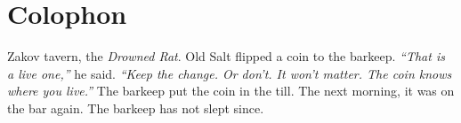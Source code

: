 \section*{Colophon}
Zakov tavern, the \textit{Drowned Rat}. Old Salt flipped a coin to the barkeep. \textit{``That is a live one,''} he said. \textit{``Keep the change. Or don't. It won't matter. The coin knows where you live.''} The barkeep put the coin in the till. The next morning, it was on the bar again. The barkeep has not slept since.